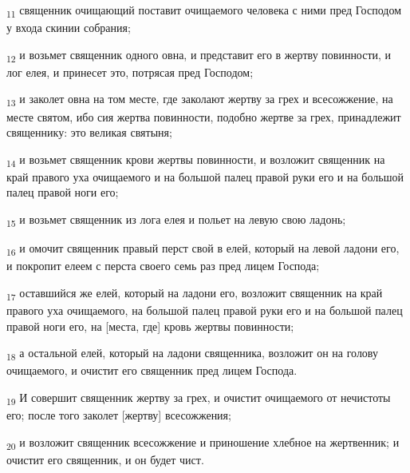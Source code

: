 \begin{tcolorbox}
\textsubscript{11} священник очищающий поставит очищаемого человека с ними пред Господом у входа скинии собрания;
\end{tcolorbox}
\begin{tcolorbox}
\textsubscript{12} и возьмет священник одного овна, и представит его в жертву повинности, и лог елея, и принесет это, потрясая пред Господом;
\end{tcolorbox}
\begin{tcolorbox}
\textsubscript{13} и заколет овна на том месте, где заколают жертву за грех и всесожжение, на месте святом, ибо сия жертва повинности, подобно жертве за грех, принадлежит священнику: это великая святыня;
\end{tcolorbox}
\begin{tcolorbox}
\textsubscript{14} и возьмет священник крови жертвы повинности, и возложит священник на край правого уха очищаемого и на большой палец правой руки его и на большой палец правой ноги его;
\end{tcolorbox}
\begin{tcolorbox}
\textsubscript{15} и возьмет священник из лога елея и польет на левую свою ладонь;
\end{tcolorbox}
\begin{tcolorbox}
\textsubscript{16} и омочит священник правый перст свой в елей, который на левой ладони его, и покропит елеем с перста своего семь раз пред лицем Господа;
\end{tcolorbox}
\begin{tcolorbox}
\textsubscript{17} оставшийся же елей, который на ладони его, возложит священник на край правого уха очищаемого, на большой палец правой руки его и на большой палец правой ноги его, на [места, где] кровь жертвы повинности;
\end{tcolorbox}
\begin{tcolorbox}
\textsubscript{18} а остальной елей, который на ладони священника, возложит он на голову очищаемого, и очистит его священник пред лицем Господа.
\end{tcolorbox}
\begin{tcolorbox}
\textsubscript{19} И совершит священник жертву за грех, и очистит очищаемого от нечистоты его; после того заколет [жертву] всесожжения;
\end{tcolorbox}
\begin{tcolorbox}
\textsubscript{20} и возложит священник всесожжение и приношение хлебное на жертвенник; и очистит его священник, и он будет чист.
\end{tcolorbox}
